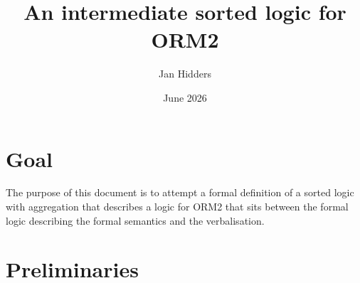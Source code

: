\documentclass[11pt]{amsart}
\title{An intermediate sorted logic for ORM2}
\author{Jan Hidders}
\date{June 2026}                                           %
\theoremstyle{definition}
\theoremstyle{remark}
\begin{document}
\maketitle

\setcounter{tocdepth}{1}
\tableofcontents

\section{Goal}

The purpose of this document is to attempt a formal definition of a sorted logic with aggregation that describes a logic for ORM2 that sits between the formal logic describing the formal semantics and the verbalisation.

\section{Preliminaries}
\label{sec:prelim}
\end{document}
